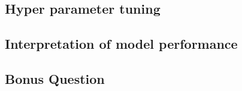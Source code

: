 \documentclass[]{article}
\begin{document}
	\subsection{Hyper parameter tuning}
	
	\subsection{Interpretation of model performance}
	\subsection{Bonus Question}
\end{document}
